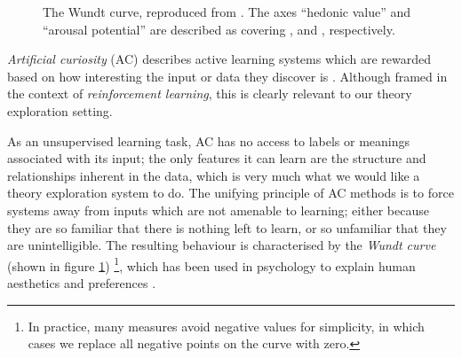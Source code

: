 \begin{figure}
  \centering

  \caption{The Wundt curve, reproduced from \citep{berlyne1970novelty}. The axes ``hedonic value'' and ``arousal potential'' are described as covering , and , respectively.}

  \label{fig:wundt}
\end{figure}

\emph{Artificial curiosity} (AC) describes active learning systems which are rewarded based on how interesting the input or data they discover is \citep{schmidhuber2006developmental}. Although framed in the context of \emph{reinforcement learning}, this is clearly relevant to our theory exploration setting.

As an unsupervised learning task, AC has no access to labels or meanings associated with its input; the only features it can learn are the structure and relationships inherent in the data, which is very much what we would like a theory exploration system to do. The unifying principle of AC methods is to force systems away from inputs which are not amenable to learning; either because they are so familiar that there is nothing left to learn, or so unfamiliar that they are unintelligible. The resulting behaviour is characterised by the \emph{Wundt curve} (shown in figure \ref{fig:wundt}) \footnote{In practice, many measures avoid negative values for simplicity, in which cases we replace all negative points on the curve with zero.}, which has been used in psychology to explain human aesthetics and preferences \citep{berlyne1970novelty}.

